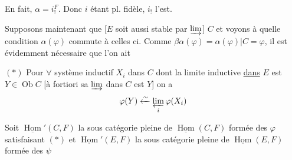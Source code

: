 En fait, $\alpha=i_!^F$. Donc $i$ étant pl. fidèle, $i_!$ l'est.

Supposons maintenant que [$E$ soit aussi stable par  $\varinjlim$] $C$  et voyons à quelle condition $\alpha(\varphi)$ commute à celles ci. Comme $\beta\alpha(\varphi)=\alpha(\varphi)|C=\varphi$, il est évidemment nécessaire que l'on ait

$(*)$ Pour $\forall$ système inductif $X_i$ dans $C$ dont la limite inductive \uline{dans} $E$ est  $Y\in\operatorname{Ob}C$ [à fortiori sa $\varinjlim$ dans $C$ est $Y$] on a
\[\varphi(Y)\xleftarrow{\sim}\varprojlim_i\varphi(X_i)\]

Soit $\underline{\operatorname{Hom}}'(C,F)$ la sous catégorie pleine de $\underline{\operatorname{Hom}}(C,F)$ formée des $\varphi$ satisfaisant $(*)$ et $\underline{\operatorname{Hom}}'(E,F)$ la sous catégorie pleine de $\underline{\operatorname{Hom}}(E,F)$ formée des $\psi$

